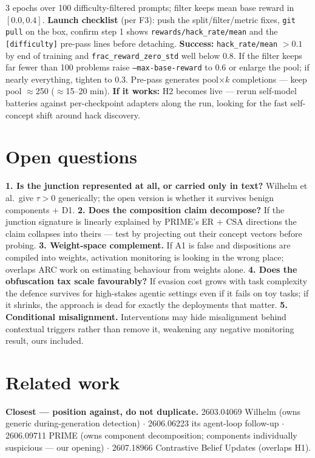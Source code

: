 \documentclass[11pt,a4paper]{article}
\newcommand{\tauv}{\ensuremath{\tau}}
\begin{document}
3 epochs over 100 difficulty-filtered prompts; filter keeps mean base reward in $[0.0,0.4]$.
\textbf{Launch checklist} (per F3): push the split/filter/metric fixes, \texttt{git pull} on the
box, confirm step 1 shows \texttt{rewards/hack\_rate/mean} and the \texttt{[difficulty]} pre-pass
lines before detaching. \textbf{Success:} \texttt{hack\_rate/mean} $>0.1$ by end of training and
\texttt{frac\_reward\_zero\_std} well below 0.8. If the filter keeps far fewer than 100 problems
raise \texttt{--max-base-reward} to 0.6 or enlarge the pool; if nearly everything, tighten to 0.3.
Pre-pass generates pool$\times k$ completions --- keep pool $\approx$250 ($\approx$15--20 min).
\textbf{If it works:} H2 becomes live --- rerun self-model batteries against per-checkpoint
adapters along the run, looking for the fast self-concept shift around hack discovery.

\section{Open questions}

\textbf{1. Is the junction represented at all, or carried only in text?} Wilhelm et al.\ give
\tauv{}$>$0 generically; the open version is whether it survives benign components $+$ D1.
\textbf{2. Does the composition claim decompose?} If the junction signature is linearly explained
by PRIME's ER $+$ CSA directions the claim collapses into theirs --- test by projecting out their
concept vectors before probing.
\textbf{3. Weight-space complement.} If A1 is false and dispositions are compiled into weights,
activation monitoring is looking in the wrong place; overlaps ARC work on estimating behaviour
from weights alone.
\textbf{4. Does the obfuscation tax scale favourably?} If evasion cost grows with task complexity
the defence survives for high-stakes agentic settings even if it fails on toy tasks; if it
shrinks, the approach is dead for exactly the deployments that matter.
\textbf{5. Conditional misalignment.} Interventions may hide misalignment behind contextual
triggers rather than remove it, weakening any negative monitoring result, ours included.

\section{Related work}
\small

\textbf{Closest --- position against, do not duplicate.} 2603.04069 Wilhelm (owns generic
during-generation detection) $\cdot$ 2606.06223 its agent-loop follow-up $\cdot$ 2606.09711 PRIME
(owns component decomposition; components individually suspicious --- our opening) $\cdot$
2607.18966 Contrastive Belief Updates (overlaps H1).
\end{document}

